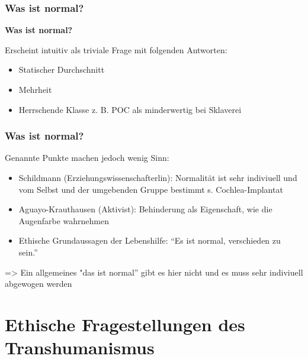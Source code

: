 \documentclass[aspectratio=169,16pt,xcolor=table]{beamer}
\begin{document}
\begin{frame}
	\frametitle{Was ist normal?}
  \textbf{Was ist normal?}

  \vspace{12pt}
  \small Erscheint intuitiv als triviale Frage mit folgenden Antworten:
	\begin{itemize}
	  \item Statischer Durchschnitt
	  \item Mehrheit
	  \item Herrschende Klasse z. B. POC als minderwertig bei Sklaverei
  \end{itemize}
\end{frame}

\begin{frame}
	\frametitle{Was ist normal?}
  \small Genannte Punkte machen jedoch wenig Sinn: 
	\begin{itemize}
	  \item Schildmann (Erziehungswissenschafterlin): Normalität ist sehr indiviuell und vom Selbst und der umgebenden Gruppe bestimmt s. Cochlea-Implantat~\cite{schildmann1999normal}
	  \item Aguayo-Krauthausen (Aktivist): Behinderung als Eigenschaft, wie die Augenfarbe wahrnehmen~\cite{aguayo2023inklusion}
	  \item Ethische Grundaussagen der Lebenshilfe: ``Es ist normal, verschieden zu sein.''~\cite{lebenshilfeFlyer}
  \end{itemize}
  => Ein allgemeines "das ist normal'' gibt es hier nicht und es muss sehr indiviuell abgewogen werden
\end{frame}

\section{Ethische Fragestellungen des Transhumanismus}
\end{document}
